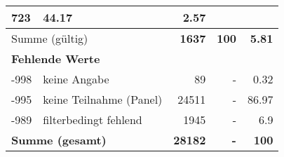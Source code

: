 \begin{longtable}{lXrrr}
       \num{723} &
       \num[round-mode=places,round-precision=2]{44.17} &
         \num[round-mode=places,round-precision=2]{2.57} \\
     \midrule
     \multicolumn{2}{l}{Summe (gültig)} &
       \textbf{\num{1637}} &
     \textbf{\num{100}} &
       \textbf{\num[round-mode=places,round-precision=2]{5.81}} \\
     \multicolumn{5}{l}{\textbf{Fehlende Werte}}\\
       -998 &
       keine Angabe &
         \num{89} &
        - &
         \num[round-mode=places,round-precision=2]{0.32} \\
       -995 &
       keine Teilnahme (Panel) &
         \num{24511} &
        - &
         \num[round-mode=places,round-precision=2]{86.97} \\
       -989 &
       filterbedingt fehlend &
         \num{1945} &
        - &
         \num[round-mode=places,round-precision=2]{6.9} \\
     \midrule
     \multicolumn{2}{l}{\textbf{Summe (gesamt)}} &
          \textbf{\num{28182}} &
        \textbf{-} &
        \textbf{\num{100}} \\
     \bottomrule
     \end{longtable}
     
